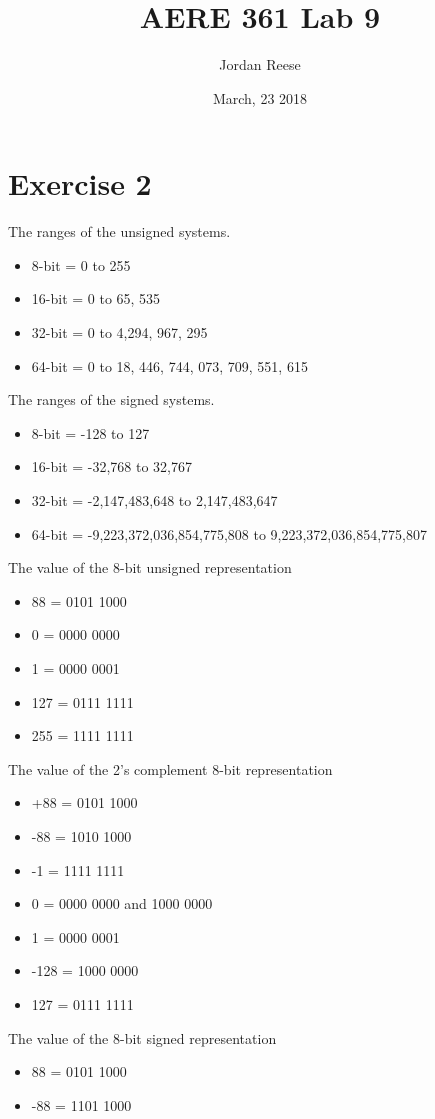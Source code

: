 \documentclass{article} \usepackage[utf8]{inputenc} \title{AERE 361 Lab 9} \author{Jordan Reese} \date{March, 23 2018} \usepackage{listings} \usepackage{color}
\begin{document}
 \maketitle \section*{Exercise 2} The ranges of the unsigned systems. \begin{itemize}
    \item 8-bit = 0 to 255
    \item 16-bit = 0 to 65, 535
    \item 32-bit = 0 to 4,294, 967, 295
    \item 64-bit = 0 to 18, 446, 744, 073, 709, 551, 615 \end{itemize} The ranges of the signed systems. \begin{itemize}
    \item 8-bit = -128 to 127
    \item 16-bit = -32,768 to 32,767
    \item 32-bit = -2,147,483,648 to 2,147,483,647
    \item 64-bit = -9,223,372,036,854,775,808 to 9,223,372,036,854,775,807 \end{itemize} The value of the 8-bit unsigned representation \begin{itemize}
    \item 88 = 0101 1000
    \item 0 = 0000 0000
    \item 1 = 0000 0001
    \item 127 = 0111 1111
    \item 255 = 1111 1111 \end{itemize} The value of the 2's complement 8-bit representation \begin{itemize}
    \item +88 = 0101 1000
    \item -88 = 1010 1000
    \item -1 = 1111 1111
    \item 0 = 0000 0000 and 1000 0000
    \item 1 = 0000 0001
    \item -128 = 1000 0000
    \item 127 = 0111 1111 \end{itemize} The value of the 8-bit signed representation \begin{itemize}
    \item 88 = 0101 1000
    \item -88 = 1101 1000

\end{itemize}
\end{document}
